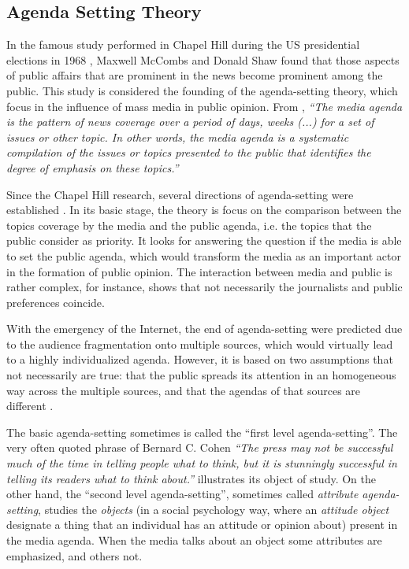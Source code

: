 
\subsection{Agenda Setting Theory}

\par In the famous study performed in Chapel Hill during the US presidential elections in 1968 \cite{mccombs1972agenda}, Maxwell McCombs and Donald Shaw found that those aspects of public affairs that are prominent in the news become prominent among the public.
This study is considered the founding of the agenda-setting theory, which focus in the influence of mass media in public opinion.  
From \cite{mccombs2014agenda}, \textit{``The media agenda is the pattern of news coverage over a period of days, weeks (...) for a set of issues or other topic. In other words, the media agenda is a systematic compilation of the issues or topics presented to the public that identifies the degree of emphasis on these topics.''}

\par Since the Chapel Hill research, several directions of agenda-setting were established \cite{mccombs2005look}.
In its basic stage, the theory is focus on the comparison between the topics coverage by the media and the public agenda, i.e. the topics that the public consider as priority.
It looks for answering the question if the media is able to set the public agenda, which would transform the media as an important actor in the formation of public opinion. The interaction between media and public is rather complex, for instance, \cite{mitchelstein2016brecha} shows that not necessarily the journalists and public preferences coincide.
\par With the emergency of the Internet, the end of agenda-setting were predicted due to the audience fragmentation onto multiple sources, which would virtually lead to a highly individualized agenda.
However, it is based on two assumptions that not necessarily are true: that the public spreads its attention in an homogeneous way across the multiple sources, and that the agendas of that sources are different \cite{mccombs2005look}.

\par The basic agenda-setting sometimes is called the ``first level agenda-setting''. 
The very often quoted phrase of Bernard C. Cohen \textit{``The press may not be successful much of the time in telling people what to think, but it is stunningly successful in telling its readers what to think about.''} illustrates its object of study.
On the other hand, the ``second level agenda-setting'', sometimes called \textit{attribute agenda-setting}, studies the \textit{objects} (in a social psychology way, where an \textit{attitude object} designate a thing that an individual has an attitude or opinion about) present in the media agenda. When the media talks about an object some attributes are emphasized, and others not. 


